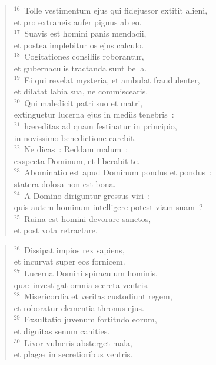 \begin{flushleft}\begin{verse}${}^{16}$~Tolle vestimentum ejus qui fidejussor extitit alieni,\\ et pro extraneis aufer pignus ab eo.\\
${}^{17}$~Suavis est homini panis mendacii,\\ et postea implebitur os ejus calculo.\\
${}^{18}$~Cogitationes consiliis roborantur,\\ et gubernaculis tractanda sunt bella.\\
${}^{19}$~Ei qui revelat mysteria, et ambulat fraudulenter,\\ et dilatat labia sua, ne commiscearis.\\
${}^{20}$~Qui maledicit patri suo et matri,\\ extinguetur lucerna ejus in mediis tenebris~:\\
${}^{21}$~h\ae reditas ad quam festinatur in principio,\\ in novissimo benedictione carebit.\\
${}^{22}$~Ne dicas~: Reddam malum~:\\ exspecta Dominum, et liberabit te.\\
${}^{23}$~Abominatio est apud Dominum pondus et pondus~;\\ statera dolosa non est bona.\\
${}^{24}$~A Domino diriguntur gressus viri~:\\ quis autem hominum intelligere potest viam suam~?\\
${}^{25}$~Ruina est homini devorare sanctos,\\ et post vota retractare.\end{verse}\end{flushleft}


\begin{flushleft}\begin{verse}${}^{26}$~Dissipat impios rex sapiens,\\ et incurvat super eos fornicem.\\
${}^{27}$~Lucerna Domini spiraculum hominis,\\ qu\ae\ investigat omnia secreta ventris.\\
${}^{28}$~Misericordia et veritas custodiunt regem,\\ et roboratur clementia thronus ejus.\\
${}^{29}$~Exsultatio juvenum fortitudo eorum,\\ et dignitas senum canities.\\
${}^{30}$~Livor vulneris absterget mala,\\ et plag\ae\ in secretioribus ventris.\end{verse}\end{flushleft}


